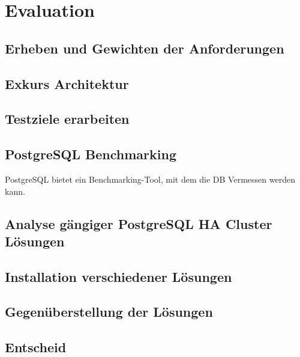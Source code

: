 
\section{Evaluation}
\subsection{Erheben und Gewichten der Anforderungen}
\subsection{Exkurs Architektur}





\subsection{Testziele erarbeiten}
\subsection{PostgreSQL Benchmarking}
PostgreSQL bietet ein Benchmarking-Tool,\cite{TYJFF7AB,VXNYQFTE} mit dem die DB Vermessen werden kann.
\subsection{Analyse gängiger PostgreSQL HA Cluster Lösungen}







\subsection{Installation verschiedener Lösungen}
\subsection{Gegenüberstellung der Lösungen}
\subsection{Entscheid}
